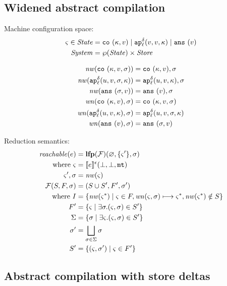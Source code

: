 \documentclass{llncs}
\newcommand{\setof}[1]{\{ #1 \}}
\newcommand{\alt}{\mid}
\begin{document}
\subsection{Widened abstract compilation}

Machine configuration space:
\begin{align*}
\mstate \in \State &= \co{\mkont, \mval} \alt
                     \ap[_\mlab^\mcntr]{\mval,\mval,\mkont} \alt
                     \ans{\mval} \\
\System &= \wp(\State) \times \Store
\end{align*}

\begin{align*}
\nw(\co{\mkont,\mval,\msto}) &= \co{\mkont, \mval}, \msto \\
\nw(\ap[^\mcntr_\mlab]{\mvalx{u},\mval,\msto,\mkont}) &= \ap[^\mcntr_\mlab]{\mvalx{u},\mval,\mkont}, \msto \\
\nw(\ans{\msto,\mval}) &= \ans{\mval}, \msto \\
\wn(\co{\mkont,\mval},\msto) &= \co{\mkont,\mval,\msto} \\
\wn(\ap[^\mcntr_\mlab]{\mvalx{u},\mval,\mkont},\msto) &= \ap[^\mcntr_\mlab]{\mvalx{u},\mval,\msto,\mkont} \\
\wn(\ans{\mval},\msto) &= \ans{\msto,\mval}
\end{align*}

Reduction semantics:
\begin{align*}
\reachable{e} &= \lfp{{\mathcal F}}(\varnothing,\setof{\mstate'},\msto) \\
 \text{ where } \mstate &= \compile{e}^{\mtcntr}(\bot,\bot,\kmt) \\
                \mstate', \msto &= \nw(\mstate) \\
{\mathcal F}(S,F,\msto) &= (S \cup S', F', \msto') \\
 \text{ where }
  I &= \setof{ \nw(\mstate^*) \mid \mstate \in F, \wn(\mstate,\msto) \machstep \mstate^*, \nw(\mstate^*)\notin S} \\
  F' &= \setof{\mstate \mid \exists \msto. \ttuple{\mstate}{\msto} \in S'} \\
  \Sigma &= \setof{\msto \mid \exists \mstate. \ttuple{\mstate}{\msto} \in S'} \\
  \msto' &= \bigsqcup\limits_{\msto\in\Sigma}{\msto} \\
  S' &= \setof{\ttuple{\mstate}{\msto'} \mid \mstate \in F'}
\end{align*}

\subsection{Abstract compilation with store deltas}
\end{document}

